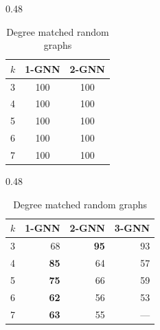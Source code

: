 \begin{table}[ht]
\centering
\caption{Results on planted graphs and degree-matched setting (at $N=100$) .}
\label{tab:exp1_and_exp2}

\begin{subtable}{0.48\textwidth}
\centering
\caption{Planted Random Graphs}
\label{tab:exp1_results}
\begin{tabular}{lcc}
\toprule
$k$ & 1-GNN & 2-GNN \\
\midrule
3   & 100 & 100 \\
4   & 100 & 100 \\
5   & 100 & 100 \\
6   & 100 & 100 \\
7   & 100 & 100 \\
\bottomrule
\end{tabular}
\end{subtable}
\hfill
\begin{subtable}{0.48\textwidth}
\centering
\caption{Degree matched random graphs}
\label{tab:wl_comparison_n100}
\begin{tabular}{lrrr}
\toprule
$k$ & 1-GNN  & 2-GNN  & 3-GNN \\
\midrule
3   & 68  & \textbf{95} & 93  \\
4   & \textbf{85}& 64          & 57  \\
5   & \textbf{75}& 66          & 59  \\
6   & \textbf{62}& 56          & 53  \\
7   & \textbf{63}& 55          & —   \\
\bottomrule
\end{tabular}
\end{subtable}

\end{table}




